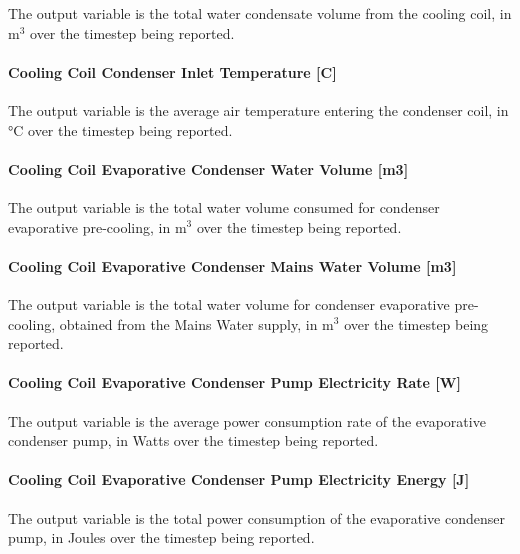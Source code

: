 The output variable is the total water condensate volume from the cooling coil, in m\(^{3}\) over the timestep being reported.

\paragraph{Cooling Coil Condenser Inlet Temperature {[}C{]}}\label{cooling-coil-condenser-inlet-temperature-c-1}

The output variable is the average air temperature entering the condenser coil, in °C over the timestep being reported.

\paragraph{Cooling Coil Evaporative Condenser Water Volume {[}m3{]}}\label{cooling-coil-evaporative-condenser-water-volume-m3-1}

The output variable is the total water volume consumed for condenser evaporative pre-cooling, in m\(^{3}\) over the timestep being reported.

\paragraph{Cooling Coil Evaporative Condenser Mains Water Volume {[}m3{]}}\label{cooling-coil-evaporative-condenser-mains-water-volume-m3}

The output variable is the total water volume for condenser evaporative pre-cooling, obtained from the Mains Water supply, in m\(^{3}\) over the timestep being reported.

\paragraph{Cooling Coil Evaporative Condenser Pump Electricity Rate {[}W{]}}\label{cooling-coil-evaporative-condenser-pump-electric-powerw}

The output variable is the average power consumption rate of the evaporative condenser pump, in Watts over the timestep being reported.

\paragraph{Cooling Coil Evaporative Condenser Pump Electricity Energy {[}J{]}}\label{cooling-coil-evaporative-condenser-pump-electric-energy-j-1}

The output variable is the total power consumption of the evaporative condenser pump, in Joules over the timestep being reported.

